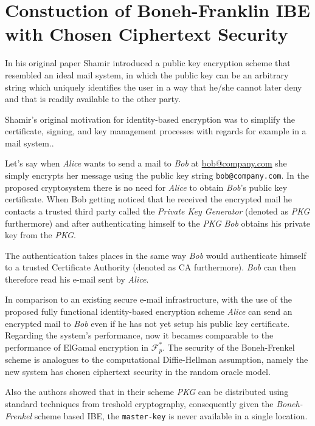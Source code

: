 \section{Constuction of Boneh-Franklin IBE with Chosen Ciphertext Security}

In his original paper \cite{Shamir41} Shamir introduced a public key encryption
scheme that resembled an ideal mail system, in which the public key can be an
arbitrary string which  uniquely identifies the user in a way that he/she
cannot later deny and that is readily available to the other party.\cite{Shamir41}

Shamir's original motivation for identity-based encryption was to simplify the
certificate, signing, and key management processes with regards
for example in a mail system.\cite{BF01}.

Let's say when \textit{Alice} wants to send  a mail to \textit{Bob} at \url{bob@company.com}
she simply encrypts her message using the public key string \lstinline{bob@company.com}. 
In the proposed cryptosystem there is no need for \textit{Alice} to obtain \textit{Bob}’s public key
certificate. When Bob getting noticed that he received the encrypted mail he contacts a trusted
third party called the \textit{Private Key Generator} (denoted as \textit{PKG}  furthermore) and 
after authenticating himself to the \textit{PKG} \textit{Bob} obtains his private key
from the \textit{PKG}. \cite{BF01}

The authentication takes places in the same way \textit{Bob} would authenticate
himself to a trusted Certificate Authority (denoted as CA furthermore).
\textit{Bob} can then therefore read his e-mail sent by \textit{Alice}.

In comparison to an existing secure e-mail infrastructure,
with the use of the proposed fully functional
identity-based encryption scheme\cite{BF01}
\textit{Alice} can send an encrypted mail to \textit{Bob} even if he has not yet
setup his public key certificate. Regarding the system's performance,
now it becames comparable to the performance of
ElGamal encryption\cite{cryptosys.elgamal} in $\mathcal{F}^{*}_p$. The security of the
Boneh-Frenkel scheme is analogues to the computational Diffie-Hellman assumption\cite{crypto.cdhddh},
namely the new system has chosen ciphertext security in the random oracle model\cite{Bellare1993}.

Also the authors showed that in their scheme \textit{PKG}
can be distributed using standard techniques from treshold
cryptography\cite{crypto.seckeydistdl}, consequently given the
\textit{Boneh-Frenkel} scheme based IBE, the
\lstinline{master-key} is never available in a single location.

